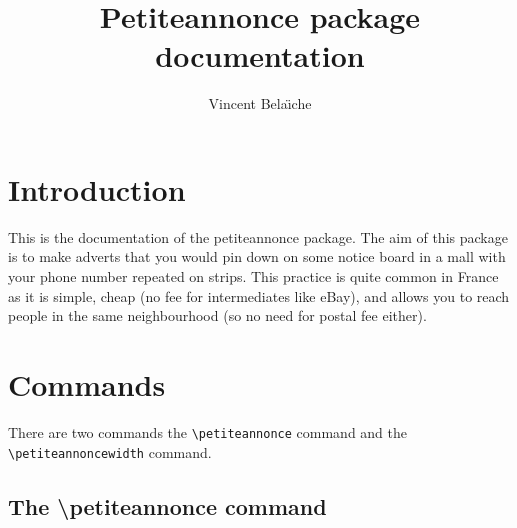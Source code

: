 \documentclass{article}
\title{Petiteannonce package documentation}
\author{Vincent Bela\"\i che}
\begin{document}
\maketitle
\section{Introduction}
This is the documentation of the petiteannonce package. The aim of this package is to
make adverts that you would pin down on some notice board in a mall with your
phone number repeated on strips. This practice is quite common in France as it
is simple, cheap (no fee for intermediates like eBay\texttrademark),
and allows you to reach people in the same neighbourhood (so no need for
postal fee either).

\section{Commands}

There are two commands the \verb!\petiteannonce! command and the \verb!\petiteannoncewidth!
command.

\subsection{The \textbackslash petiteannonce command}
\end{document}
